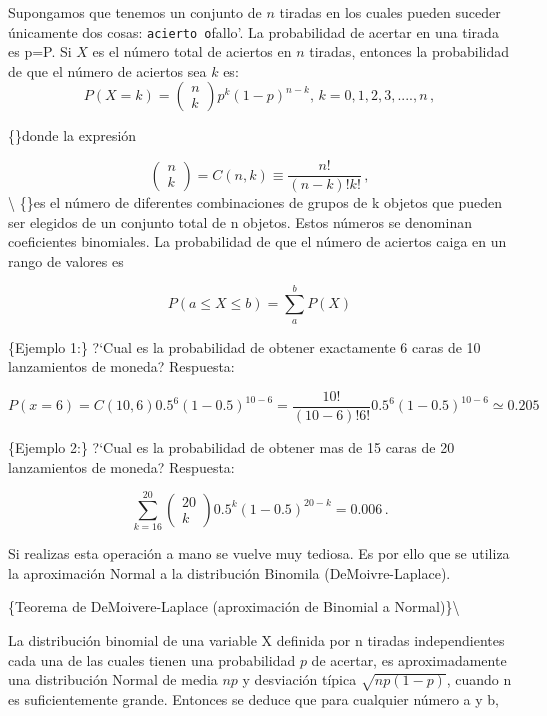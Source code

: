 \documentclass[
]{agujournal2019}
\begin{document}
Supongamos que tenemos un conjunto de \(n\) tiradas en los cuales pueden
suceder únicamente dos cosas:
\texttt{acierto\textquotesingle{}\ o}fallo'. La probabilidad de acertar
en una tirada es p=P. Si \(X\) es el número total de aciertos en \(n\)
tiradas, entonces la probabilidad de que el número de aciertos sea \(k\)
es: \[P(X=k)=\left( \begin{array}{c}
 n \\ k
       \end{array} \right)
p^k (1-p)^{n-k}, \, k=0,1,2,3,....,n\,,\]

\{\noindent\}donde la expresión

\[\left( \begin{array}{c}
 n \\ k
       \end{array} \right)=C(n,k)\equiv\frac{n!}{(n-k)!k!}\,,\]
\textbackslash{} \{\noindent\}es el número de diferentes combinaciones
de grupos de k objetos que pueden ser elegidos de un conjunto total de n
objetos. Estos números se denominan coeficientes binomiales. La
probabilidad de que el número de aciertos caiga en un rango de valores
es

\[P(a\le X\le b)=\sum^b_a P(X)\]

\vspace{0.5cm}

\{\noindent  Ejemplo 1:\} ?{}`Cual es la probabilidad de obtener
exactamente 6 caras de 10 lanzamientos de moneda? Respuesta:

\[P(x=6) = C(10,6)0.5^6(1-0.5)^{10-6} = \frac{10!}{(10-6)!6!}0.5^6(1-0.5)^{10-6} \simeq 0.205\]

\vspace{0.5cm} \{\noindent  Ejemplo 2:\} ?{}`Cual es la probabilidad de
obtener mas de 15 caras de 20 lanzamientos de moneda? Respuesta:

\[\sum^{20}_{k=16} \left( \begin{array}{c} 20 \\ k
       \end{array} \right) 0.5^k(1-0.5)^{20-k}=0.006\,.\]

Si realizas esta operación a mano se vuelve muy tediosa. Es por ello que
se utiliza la aproximación Normal a la distribución Binomila
(DeMoivre-Laplace).

\vspace{0.5cm} \{\noindent  Teorema de DeMoivere-Laplace (aproximación
de Binomial a Normal)\}\textbackslash{}

La distribución binomial de una variable X definida por n tiradas
independientes cada una de las cuales tienen una probabilidad \(p\) de
acertar, es aproximadamente una distribución Normal de media \(np\) y
desviación típica \(\sqrt{np(1-p)}\), cuando n es suficientemente
grande. Entonces se deduce que para cualquier número a y b,
\end{document}
